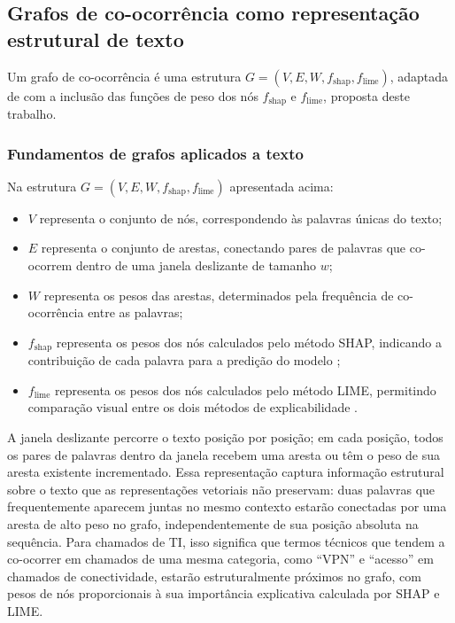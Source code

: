 \documentclass[
    12pt,                %
    openright,           %
    oneside,             %
    a4paper,             %
    english,             %
    brazil               %
]{abntex2}
\begin{document}
\subsection{Grafos de co-ocorrência como representação estrutural de texto}

Um grafo de co-ocorrência é uma estrutura $G = (V, E, W, f_{\text{shap}}, f_{\text{lime}})$, adaptada de  com a inclusão das funções de peso dos nós $f_{\text{shap}}$ e $f_{\text{lime}}$, proposta deste trabalho. 

\subsubsection{Fundamentos de grafos aplicados a texto}
\label{subsec:grafos_fundamentos}

\label{subsubsec:grafos_definicao}

Na estrutura $G = (V, E, W, f_{\text{shap}}, f_{\text{lime}})$ apresentada acima:

\begin{itemize}
    \item $V$ representa o conjunto de nós, correspondendo às
    palavras únicas do texto;
    
    \item $E$ representa o conjunto de arestas, conectando pares 
    de palavras que co-ocorrem dentro de uma janela 
    deslizante de tamanho $w$;
    
    \item $W$ representa os pesos das arestas, determinados pela 
    frequência de co-ocorrência entre as palavras;
    
    \item $f_{\text{shap}}$ representa os pesos dos nós calculados 
    pelo método SHAP, indicando a contribuição de cada 
    palavra para a predição do modelo \cite{lundberg2017};
    
    \item $f_{\text{lime}}$ representa os pesos dos nós calculados 
    pelo método LIME, permitindo comparação visual entre os dois 
    métodos de explicabilidade \cite{ribeiro2016}.
\end{itemize}

A janela deslizante \cite{yao2019} percorre o texto posição por posição; em cada posição, todos os pares de palavras dentro da janela recebem uma aresta ou têm o peso de sua aresta existente incrementado. Essa representação captura informação 
estrutural sobre o texto que as representações vetoriais não 
preservam: duas palavras que frequentemente aparecem juntas 
no mesmo contexto estarão conectadas por uma aresta de alto peso 
no grafo, independentemente de sua posição absoluta na sequência. 
Para chamados de TI, isso significa que termos técnicos que tendem 
a co-ocorrer em chamados de uma mesma categoria, como ``VPN'' e 
``acesso'' em chamados de conectividade, estarão estruturalmente 
próximos no grafo, com pesos de nós proporcionais à sua 
importância explicativa calculada por SHAP e LIME.
\end{document}
